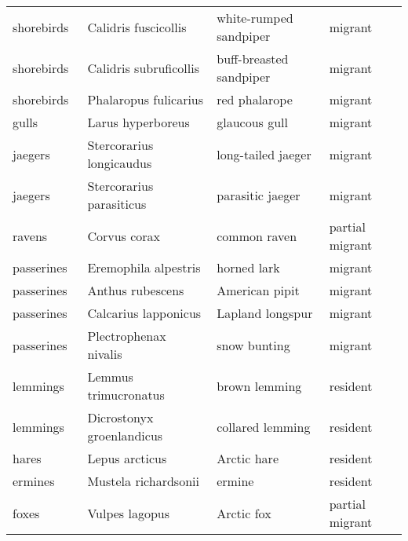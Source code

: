 \begin{table}[ht]
\begin{tabularx}{0.95\textwidth}{llll}
  shorebirds  & Calidris fuscicollis & white-rumped sandpiper & migrant \\ 
  shorebirds  & Calidris subruficollis & buff-breasted sandpiper & migrant \\ 
  shorebirds  & Phalaropus fulicarius & red phalarope & migrant \\ 
  gulls  & Larus hyperboreus & glaucous gull & migrant \\ 
  jaegers  & Stercorarius longicaudus & long-tailed jaeger & migrant \\ 
  jaegers  & Stercorarius parasiticus & parasitic jaeger & migrant \\ 
  ravens  & Corvus corax & common raven & partial migrant \\ 
  passerines  & Eremophila alpestris & horned lark & migrant \\ 
  passerines  & Anthus rubescens & American pipit & migrant \\ 
  passerines  & Calcarius lapponicus & Lapland longspur & migrant \\ 
  passerines  & Plectrophenax nivalis & snow bunting & migrant \\ 
  lemmings  & Lemmus trimucronatus & brown lemming & resident \\ 
  lemmings  & Dicrostonyx groenlandicus & collared lemming & resident \\ 
  hares  & Lepus arcticus & Arctic hare & resident \\ 
  ermines  & Mustela richardsonii & ermine & resident \\ 
  foxes  & Vulpes lagopus & Arctic fox & partial migrant \\ 
   \hline
\end{tabularx}
\endgroup
\end{table}
